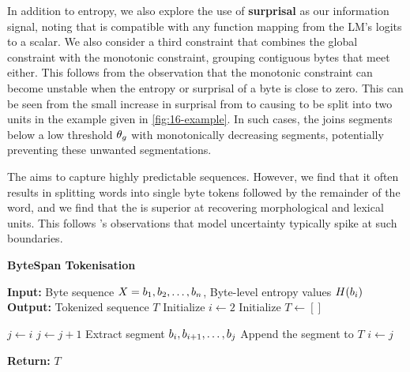 In addition to entropy, we also explore the use of \textbf{surprisal} as our information signal, noting that \tokname is compatible with any function mapping from the LM's logits to a scalar. We also consider a third constraint that combines the global constraint with the monotonic constraint, grouping contiguous bytes that meet either. This follows from the observation that the monotonic constraint can become unstable when the entropy or surprisal of a byte is close to zero. This can be seen from the small increase in surprisal from  to  causing  to be split into two units in the example given in \cref{fig:16-example}. In such cases, the  joins segments below a low threshold \(\theta_g \) with monotonically decreasing segments, potentially preventing these unwanted segmentations.


The  aims to capture highly predictable sequences. However, we find that it often results in splitting words into single byte tokens followed by the remainder of the word, and we find that the  is superior at recovering morphological and lexical units. This follows \citet{elman-1990-finding}'s observations that model uncertainty typically spike at such boundaries.

\begin{algorithm}[t]
\caption{\textbf{ByteSpan Tokenisation}}
\begin{algorithmic}[1]
\STATE \textbf{Input:} Byte sequence $X = b_1, b_2, \dots, b_n$, Byte-level entropy values $H(b_i)$
\STATE \textbf{Output:} Tokenized sequence $T$
\STATE Initialize $i \gets 2$ 
\STATE Initialize $T \gets []$ 

    \STATE $j \gets i$
        \STATE $j \gets j + 1$
    \ENDWHILE
    \STATE Extract segment $b_i, b_{i+1}, \dots, b_{j}$
    \STATE Append the segment to $T$
    \STATE $i \gets j$
\ENDWHILE

\STATE \textbf{Return:} $T$
\end{algorithmic}
\label{alg:1}
\end{algorithm}

